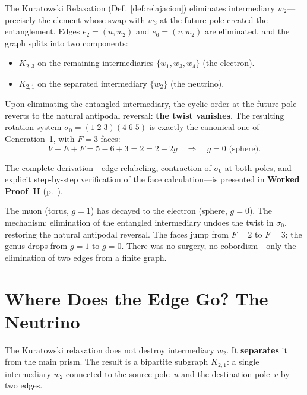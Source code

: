 The Kuratowski Relaxation (Def.~\ref{def:relajacion}) eliminates
intermediary $w_2$---precisely the element whose swap with $w_3$
at the future pole created the entanglement. Edges
$e_2 = (u, w_2)$ and $e_6 = (v, w_2)$ are eliminated, and the graph splits into two
components:
\begin{itemize}
  \item $K_{2,3}$ on the remaining intermediaries $\{w_1, w_3, w_4\}$
        (the electron).
  \item $K_{2,1}$ on the separated intermediary $\{w_2\}$ (the neutrino).
\end{itemize}

Upon eliminating the entangled intermediary, the cyclic order at the future
pole reverts to the natural antipodal reversal: \textbf{the twist
vanishes}. The resulting rotation system
$\sigma_0 = (1\;2\;3)(4\;6\;5)$ is exactly the canonical one of
Generation~1, with $F = 3$ faces:
\[
  V - E + F = 5 - 6 + 3 = 2 = 2 - 2g
  \quad\Longrightarrow\quad \boxed{g = 0}\text{ (sphere).}
\]

The complete derivation---edge relabeling, contraction of
$\sigma_0$ at both poles, and explicit step-by-step verification of the face
calculation---is presented in
\textbf{Worked Proof~II}
(p.~\pageref{sec:demo-muon}).

\begin{result}[title={Muon decay}]
The muon (torus, $g = 1$) has decayed to the electron (sphere, $g = 0$).
The mechanism: elimination of the entangled intermediary undoes the twist
in $\sigma_0$, restoring the natural antipodal reversal. The faces
jump from $F = 2$ to $F = 3$; the genus drops from $g = 1$ to $g = 0$. There
was no surgery, no cobordism---only the elimination of two
edges from a finite graph.
\end{result}

\section{Where Does the Edge Go? The Neutrino}
\label{sec:neutrino}

The Kuratowski relaxation does not destroy intermediary $w_2$. It
\textbf{separates} it from the main prism. The result is a bipartite
subgraph $K_{2,1}$: a single intermediary $w_2$ connected to the
source pole~$u$ and the destination pole~$v$ by two edges.

